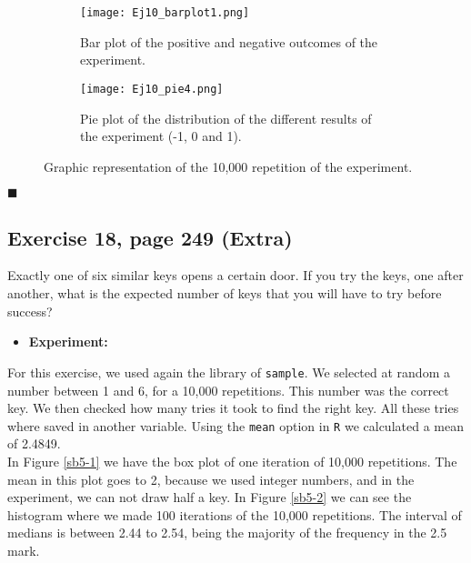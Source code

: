 \documentclass{article}
\begin{document}
\begin{figure}[]
\begin{subfigure}{.5\textwidth}
  \centering
  \texttt{[image: Ej10\_barplot1.png]}  
  \caption{Bar plot of the positive and negative outcomes of the experiment. }
  \label{sb4-1}
\end{subfigure}\hspace{5mm}%
\begin{subfigure}{.5\textwidth}
  \centering
  \texttt{[image: Ej10\_pie4.png]}  
  \caption{Pie plot of the distribution of the different results of the experiment (-1, 0 and 1).}
  \label{sb4-2}
\end{subfigure}
	\caption{Graphic representation of the 10,000 repetition of the experiment. }
\label{fig4}
\end{figure}

\begin{flushright}
$\blacksquare$
\end{flushright}

\subsection{Exercise 18, page 249 (Extra)}

Exactly one of six similar keys opens a certain door. If you try the keys, one after another, what is the expected number of keys that you will have to try before success?\\


\begin{itemize}
\item \textbf{Experiment:}
\end{itemize}

For this exercise, we used again the library of \texttt{sample}. We selected at random a number between 1 and 6, for a 10,000 repetitions. This number was the correct key. We then checked how many tries it took to find the right key. All these tries where saved in another variable. Using the \texttt{mean} option in \texttt{R} we calculated a mean of 2.4849. \\

In Figure \ref{sb5-1} we have the box plot of one iteration of 10,000 repetitions. The mean in this plot goes to 2, because we used integer numbers, and in the experiment, we can not draw half a key. In Figure \ref{sb5-2} we can see the histogram where we made 100 iterations of the 10,000 repetitions. The interval of medians is between 2.44 to 2.54, being the majority of the frequency in the 2.5 mark.\\
\end{document}
